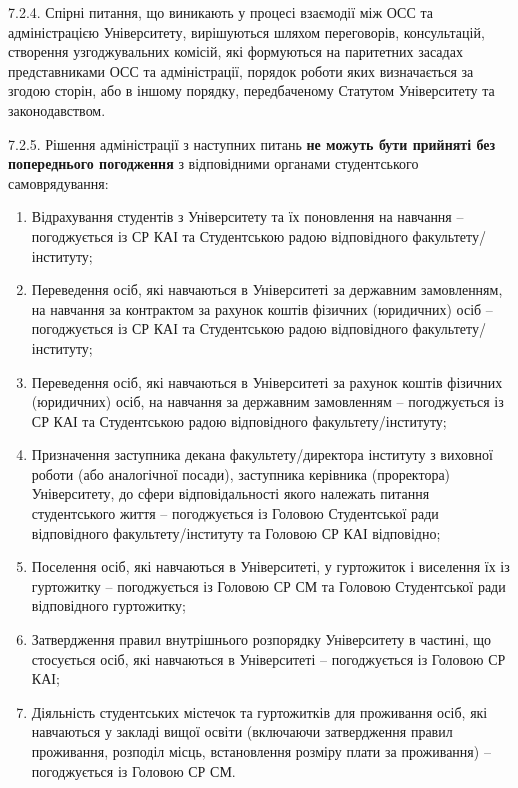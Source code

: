     7.2.4. Спірні питання, що виникають у процесі взаємодії між ОСС та адміністрацією Університету, вирішуються шляхом переговорів, консультацій, створення узгоджувальних комісій, які формуються на паритетних засадах представниками ОСС та адміністрації, порядок роботи яких визначається за згодою сторін, або в іншому порядку, передбаченому Статутом Університету та законодавством.

    7.2.5. Рішення адміністрації з наступних питань \textbf{не можуть бути прийняті без попереднього погодження} з відповідними органами студентського самоврядування:

        \begin{enumerate}[label=\arabic*)]
            \item Відрахування студентів з Університету та їх поновлення на навчання -- погоджується із СР КАІ та Студентською радою відповідного факультету/інституту;
            \item Переведення осіб, які навчаються в Університеті за державним замовленням, на навчання за контрактом за рахунок коштів фізичних (юридичних) осіб -- погоджується із СР КАІ та Студентською радою відповідного факультету/інституту;
            \item Переведення осіб, які навчаються в Університеті за рахунок коштів фізичних (юридичних) осіб, на навчання за державним замовленням -- погоджується із СР КАІ та Студентською радою відповідного факультету/інституту;
            \item Призначення заступника декана факультету/директора інституту з виховної роботи (або аналогічної посади), заступника керівника (проректора) Університету, до сфери відповідальності якого належать питання студентського життя -- погоджується із Головою Студентської ради відповідного факультету/інституту та Головою СР КАІ відповідно;
            \item Поселення осіб, які навчаються в Університеті, у гуртожиток і виселення їх із гуртожитку -- погоджується із Головою СР СМ та Головою Студентської ради відповідного гуртожитку;
            \item Затвердження правил внутрішнього розпорядку Університету в частині, що стосується осіб, які навчаються в Університеті -- погоджується із Головою СР КАІ;
            \item Діяльність студентських містечок та гуртожитків для проживання осіб, які навчаються у закладі вищої освіти (включаючи затвердження правил проживання, розподіл місць, встановлення розміру плати за проживання) -- погоджується із Головою СР СМ.
        \end{enumerate}

